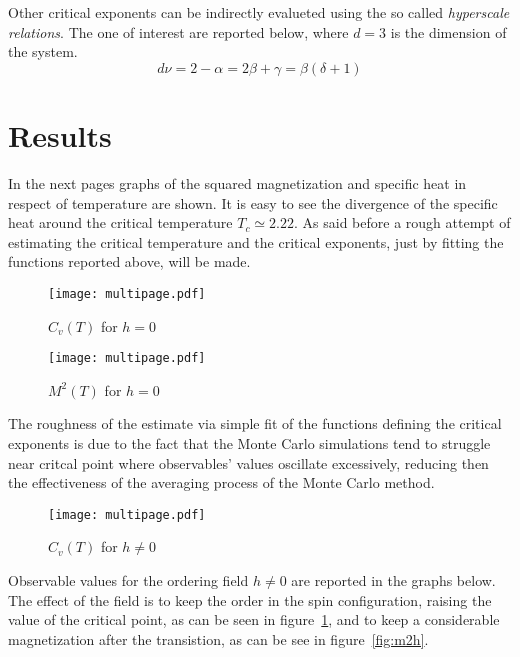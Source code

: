 Other critical exponents can be indirectly evalueted using the so called 
\emph{hyperscale relations}. The one of interest are reported below, where $d=3$ 
is the dimension of the system.
\begin{equation}
\label{eq:hyper}
d \nu = 2 - \alpha = 2 \beta + \gamma = \beta(\delta + 1) 
\end{equation}


\section{Results}

In the next pages graphs of the squared magnetization and specific heat in respect of
temperature are shown. It is easy to see the divergence of the specific heat around 
the critical temperature $T_c \simeq 2.22$. As said before a rough attempt 
of estimating the critical temperature and the critical exponents, just by
fitting the functions reported above, will be made.

\begin{figure}[H]
\centering
\texttt{[image: multipage.pdf]}
\caption{$C_v (T)$ for $h=0$}
\end{figure}

\begin{figure}[H]                                   
\centering                                       
\texttt{[image: multipage.pdf]}
\caption{$M^2 (T)$ for $h=0$}                    
\end{figure}                                     

The roughness of the estimate via simple fit of the functions defining the critical
exponents is due to the fact that the Monte Carlo simulations tend to struggle near critcal
point where observables' values oscillate excessively, reducing then the effectiveness
of the averaging process of the Monte Carlo method. 

\begin{figure}[H]
\centering                                       
\texttt{[image: multipage.pdf]}
\caption{$C_v (T)$ for $h \neq 0$}                    
\label{fig:cvh}
\end{figure}                                     

Observable values for the ordering field $h\neq 0$ are reported in the graphs below. 
The effect of the field is to keep the order in the spin configuration, raising the
value of the critical point, as can be seen in figure~\ref{fig:cvh}, and to keep
a considerable magnetization after the transistion, as can be see in 
figure~\ref{fig:m2h}.

